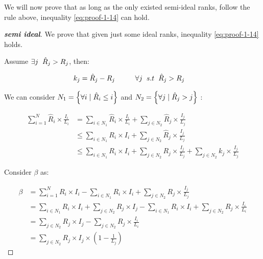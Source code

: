 \documentclass{article}
\begin{document}
We will now prove that as long as the only existed semi-ideal ranks, follow the rule above, inequality \ref{eq:proof-1-14} can hold.
 
\begin{proof}[\textbf{semi ideal}]
	We prove that given just some ideal ranks, inequality \ref{eq:proof-1-14} holds.
	
	 Assume $\exists j \hspace{2mm}\hat{R}_j > R_j$, then:
	 
	 \begin{align}
	 	\label{eq:proof-1-24}
	 	k_j = \hat{R}_j - R_j \hspace{10mm}&  \forall j \hspace{2mm}s.t \hspace{2mm} \hat{R}_j > R_j
	 \end{align}
 
 We can consider $N_1 = \left\{\forall i \hspace{1mm}|\hspace{1mm} \hat{R}_i \leq i\right\}$ and $N_2 = \left\{\forall j \hspace{1mm}|\hspace{1mm} \hat{R}_j > j\right\}$ : 
 
 \begin{align}
 	\label{eq:proof-1-25}
 	\sum_{i=1}^{N} \hat{R}_i \times \frac{I_i}{L_i} &= \sum_{i\in N_1} \hat{R}_i \times \frac{I_i}{L_i} +  \sum_{j\in N_2} \hat{R}_j \times \frac{I_j}{L_j}
 	\nonumber\\
 	&\leq 
 	\sum_{i\in N_1} R_i \times I_i +  \sum_{j\in N_2} \hat{R}_j \times \frac{I_j}{L_j}
 	\nonumber \\
 	&\leq 
 	\sum_{i\in N_1} R_i \times I_i +  \sum_{j\in N_2} R_j \times \frac{I_j}{L_j} + \sum_{j\in N_2} k_j \times \frac{I_j}{L_j}
 \end{align}

Consider $\beta$ as:

\begin{align}
	\label{eq:proof-1-26}
	\beta &= \sum_{i = 1}^{N} R_i \times I_i - \sum_{i\in N_1} R_i \times I_i +  \sum_{j\in N_2} R_j \times \frac{I_j}{L_j}
	\nonumber\\
	&= \sum_{i \in N_1} R_i \times I_i + \sum_{j \in N_2} R_j \times I_j - \sum_{i\in N_1} R_i \times I_i +  \sum_{j\in N_2} R_j \times \frac{I_i}{L_i}
	\nonumber\\
	&= \sum_{j \in N_2} R_j \times I_j -  \sum_{j\in N_2} R_j \times \frac{I_i}{L_i}
	\nonumber\\
	&= \sum_{j \in N_2} R_j \times I_j \times (1 - \frac{1}{L_j})
\end{align}


\end{proof}
\end{document}
